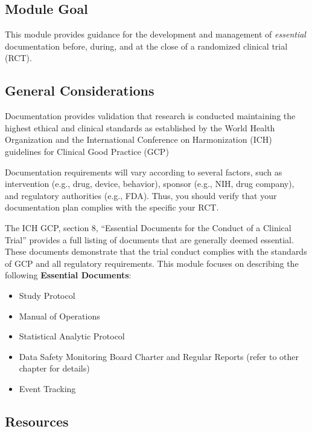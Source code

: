 \documentclass[]{book}
\providecommand{\tightlist}{%
  \setlength{\itemsep}{0pt}\setlength{\parskip}{0pt}}
\begin{document}
\subsection{Module Goal}\label{module-goal-1}

This module provides guidance for the development and management of
\emph{essential} documentation before, during, and at the close of a
randomized clinical trial (RCT).

\subsection{General Considerations}\label{general-considerations}

Documentation provides validation that research is conducted maintaining
the highest ethical and clinical standards as established by the World
Health Organization and the International Conference on Harmonization
(ICH) guidelines for Clinical Good Practice (GCP)

Documentation requirements will vary according to several factors, such
as intervention (e.g., drug, device, behavior), sponsor (e.g., NIH, drug
company), and regulatory authorities (e.g., FDA). Thus, you should
verify that your documentation plan complies with the specific your RCT.

The ICH GCP, section 8, ``Essential Documents for the Conduct of a
Clinical Trial'' provides a full listing of documents that are generally
deemed essential. These documents demonstrate that the trial conduct
complies with the standards of GCP and all regulatory requirements. This
module focuses on describing the following \textbf{Essential Documents}:

\begin{itemize}
\tightlist
\item
  Study Protocol
\item
  Manual of Operations
\item
  Statistical Analytic Protocol
\item
  Data Safety Monitoring Board Charter and Regular Reports (refer to
  other chapter for details)
\item
  Event Tracking
\end{itemize}

\subsection{Resources}\label{resources-11}
\end{document}
